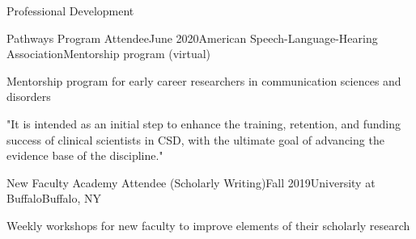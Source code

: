 \documentclass{resume} %
\begin{document}
\begin{rSection}{Professional Development}


	\begin{rSubsection}{Pathways Program Attendee}{June 2020}{American Speech-Language-Hearing Association}{Mentorship program (virtual)}
		\item Mentorship program for early career researchers in communication sciences and disorders
		\item "It is intended as an initial step to enhance the training, retention, and funding success of clinical scientists in CSD, with the ultimate goal of advancing the evidence base of the discipline."
	\end{rSubsection}

	\begin{rSubsection}{New Faculty Academy Attendee (Scholarly Writing)}{Fall 2019}{University at Buffalo}{Buffalo, NY}
		\item Weekly workshops for new faculty to improve elements of their scholarly research
	\end{rSubsection}


\end{rSection}
\end{document}
